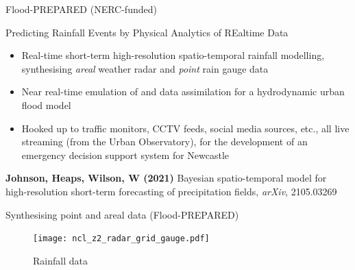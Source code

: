 \begin{frame}{Flood-PREPARED (NERC-funded)}
\protect\hypertarget{flood-prepared-nerc-funded}{}

\begin{block}{Predicting Rainfall Events by Physical Analytics of
REaltime Data}

\begin{itemize}
\tightlist
\item
  Real-time short-term high-resolution spatio-temporal rainfall
  modelling, synthesising \emph{areal} weather radar and \emph{point}
  rain gauge data
\item
  Near real-time emulation of and data assimilation for a hydrodynamic
  urban flood model
\item
  Hooked up to traffic monitors, CCTV feeds, social media sources, etc.,
  all live streaming (from the Urban Observatory), for the development
  of an emergency decision support system for Newcastle
\end{itemize}

\textbf{Johnson, Heaps, Wilson, W (2021)} Bayesian spatio-temporal model
for high-resolution short-term forecasting of precipitation fields,
\emph{arXiv}, 2105.03269

\end{block}

\end{frame}

\begin{frame}{Synthesising point and areal data (Flood-PREPARED)}
\protect\hypertarget{synthesising-point-and-areal-data-flood-prepared}{}

\begin{figure}
\centering
\texttt{[image: ncl\_z2\_radar\_grid\_gauge.pdf]}
\caption{Rainfall data}
\end{figure}

\end{frame}



